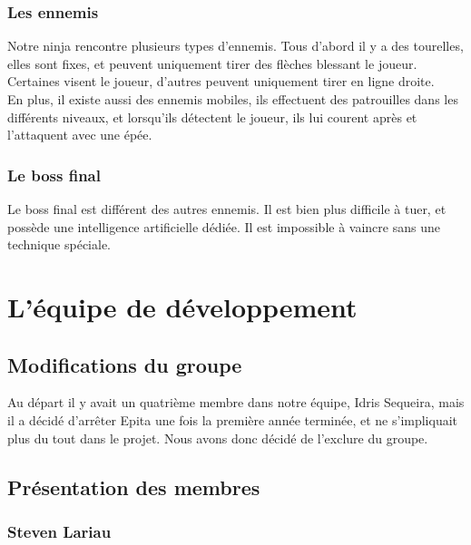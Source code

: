 \documentclass[12pt]{article}
\begin{document}
\subsubsection{Les ennemis}

Notre ninja rencontre plusieurs types d'ennemis. Tous d'abord il y a des tourelles, elles sont fixes, et peuvent uniquement tirer des flèches blessant le joueur. Certaines visent le joueur, d'autres peuvent uniquement tirer en ligne droite.\\
En plus, il existe aussi des ennemis mobiles, ils effectuent des patrouilles dans les différents niveaux, et lorsqu'ils détectent le joueur, ils lui courent après et l'attaquent avec une épée.


\subsubsection{Le boss final}

Le boss final est différent des autres ennemis. Il est bien plus difficile à tuer, et possède une intelligence artificielle dédiée. Il est impossible à vaincre sans une technique spéciale.

\section{L'équipe de développement}

\subsection{Modifications du groupe}

Au départ il y avait un quatrième membre dans notre équipe, Idris Sequeira, mais il a décidé d'arrêter Epita une fois la première année terminée, et ne s'impliquait plus du tout dans le projet. Nous avons donc décidé de l'exclure du groupe.

\subsection{Présentation des membres}

\subsubsection{Steven Lariau}
\end{document}
